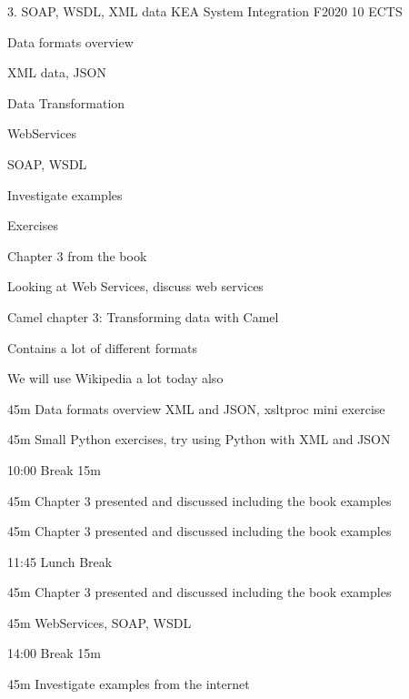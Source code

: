 \documentclass[Screen16to9,17pt]{foils}
\begin{document}
\mytitlepage
{3. SOAP, WSDL, XML data}
{KEA System Integration F2020 10 ECTS}


\begin{list2}
\item Data formats overview
\item XML data, JSON
\item Data Transformation
\item WebServices
\item SOAP, WSDL
\item Investigate examples
\end{list2}

Exercises
\begin{list2}
\item Chapter 3 from the book
\item Looking at Web Services, discuss web services
\end{list2}



\begin{list1}
\item Camel chapter 3: Transforming data with Camel
\item Contains a lot of different formats
\item We will use Wikipedia a lot today also
\end{list1}


\begin{list2}
\item 45m Data formats overview XML and JSON, xsltproc mini exercise
\item 45m Small Python exercises, try using Python with XML and JSON
\item 10:00 Break 15m
\item 45m Chapter 3 presented and discussed including the book examples
\item 45m Chapter 3 presented and discussed including the book examples
\item 11:45 Lunch Break
\item 45m Chapter 3 presented and discussed including the book examples
\item 45m WebServices, SOAP, WSDL
\item 14:00 Break 15m
\item 45m Investigate examples from the internet
\end{list2}
\end{document}

